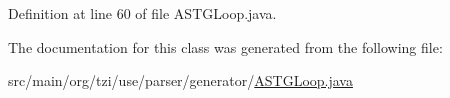 Definition at line 60 of file A\-S\-T\-G\-Loop.\-java.



The documentation for this class was generated from the following file\-:\begin{DoxyCompactItemize}
\item 
src/main/org/tzi/use/parser/generator/\hyperlink{_a_s_t_g_loop_8java}{A\-S\-T\-G\-Loop.\-java}\end{DoxyCompactItemize}
